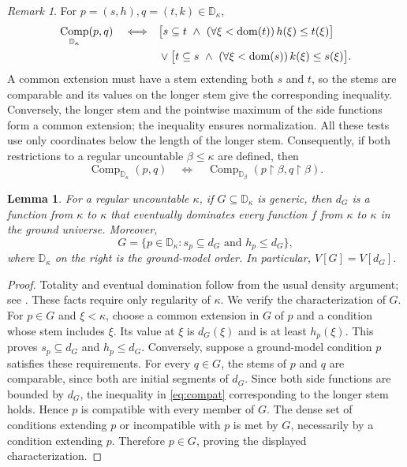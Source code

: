 \documentclass[11pt,a4paper]{amsart}
\newtheorem{lemma}[theorem]{Lemma}
\theoremstyle{definition}
\theoremstyle{remark}
\newtheorem{remark}[theorem]{Remark}
\newcommand{\D}{\mathbb D}
\DeclareMathOperator{\dom}{dom}
\DeclareMathOperator{\Comp}{Comp}
\begin{document}
\begin{remark}\label{rem:compatibility}
For \(p=(s,h),q=(t,k)\in\D_\kappa\),
\begin{align}
 \Comp_{\D_\kappa}(p,q)\quad\Longleftrightarrow\quad
 &\bigl[s\subseteq t\ \land\
       (\forall\xi<\dom(t))\,h(\xi)\leq t(\xi)\bigr]\notag\\
 &{}\lor\bigl[t\subseteq s\ \land\
       (\forall\xi<\dom(s))\,k(\xi)\leq s(\xi)\bigr].
 \label{eq:compat}
\end{align}
A common extension must have a stem extending both \(s\) and \(t\),
so the stems are comparable and its values on the longer stem give
the corresponding inequality. Conversely, the longer stem and the
pointwise maximum of the side functions form a common extension;
the inequality ensures normalization. All these tests use only
coordinates below the length of the longer stem. Consequently, if
both restrictions to a regular uncountable \(\beta\leq\kappa\)
are defined, then
\[
 \Comp_{\D_\kappa}(p,q)
 \quad\Longleftrightarrow\quad
 \Comp_{\D_\beta}(p\restriction\beta,q\restriction\beta).
\]
\end{remark}

\begin{lemma}\label{lem:hechler-basic}
For a regular uncountable \(\kappa\), if
\(G\subseteq\D_\kappa\) is generic, then
\(d_G\) is a function from \(\kappa\) to \(\kappa\)
that eventually dominates every function \(f\) from
\(\kappa\) to \(\kappa\) in the ground universe. Moreover,
\[
 G=\{p\in\D_\kappa:s_p\subseteq d_G
                     \text{ and }h_p\leq d_G\},
\]
where \(\D_\kappa\) on the right is the ground-model order.
In particular, \(V[G]=V[d_G]\).
\end{lemma}
\begin{proof}
Totality and eventual domination follow from the usual density
argument; see \cite[Section~4.2]{BBFM}. These facts require only
regularity of \(\kappa\). We verify the characterization of \(G\).
For \(p\in G\) and \(\xi<\kappa\), choose a common extension
in \(G\) of \(p\) and a condition whose stem includes \(\xi\).
Its value at \(\xi\) is \(d_G(\xi)\) and is at least
\(h_p(\xi)\). This proves \(s_p\subseteq d_G\) and
\(h_p\leq d_G\). Conversely, suppose a ground-model condition
\(p\) satisfies these requirements. For every \(q\in G\), the
stems of \(p\) and \(q\) are comparable, since
both are initial segments of \(d_G\). Since both side functions
are bounded by \(d_G\), the inequality in \eqref{eq:compat}
corresponding to the longer stem holds. Hence \(p\) is compatible
with every member of \(G\). The dense set of conditions extending \(p\)
or incompatible with \(p\) is met by \(G\), necessarily by a
condition extending \(p\). Therefore \(p\in G\), proving the
displayed characterization.
\end{proof}
\end{document}
